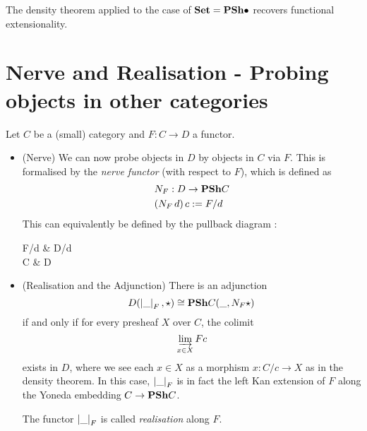 \documentclass{article}
\begin{document}
\begin{eg}
  
  The density theorem applied to the case of $\mathbf{Set} = \mathbf{PSh} \bullet$
  recovers functional extensionality.
\end{eg}

\section{Nerve and Realisation - Probing objects in other categories}

\begin{prop}

  Let $C$ be a (small) category and
  $F :  C \to D$ a functor.
  \begin{itemize}
    \item (Nerve)
    We can now probe objects in $D$ by objects in $C$ via $F$.
    This is formalised by the \emph{nerve functor} (with respect to $F$),
    which is defined as 
    \begin{align*}
      &N_F : D \to \mathbf{PSh} C \\
      &( N_F \, d ) \, c := F / d
    \end{align*}
    This can equivalently be defined by the pullback diagram : 
    \begin{cd}
      {F/d} & {D/d} \\
      C & D
      \arrow[from=1-1, to=2-1]
      \arrow[from=2-1, to=2-2]
      \arrow[from=1-2, to=2-2]
      \arrow[from=1-1, to=1-2]
      \arrow["\lrcorner"{anchor=center, pos=0.125}, draw=none, from=1-1, to=2-2]
    \end{cd}
    \item (Realisation and the Adjunction)
    There is an adjunction
    \[
      D ( \left\vert \_ \right\vert_F , \star) \cong \mathbf{PSh} C ( \_ , N_F \star)
    \]
    if and only if for every presheaf $X$ over $C$,
    the colimit \[
      \varinjlim_{x \in X} F c  
    \]
    exists in $D$, where we see each $x \in X$ as a morphism $x : C / c \to X$
    as in the density theorem.
    In this case,
    $\left\vert \_ \right\vert_F$ is in fact the left Kan extension of $F$
    along the Yoneda embedding $C \to \mathbf{PSh} C$.

    The functor $\left\vert \_ \right\vert_F$ is called \emph{realisation} along $F$.

  \end{itemize}

 

\end{prop}
\end{document}
